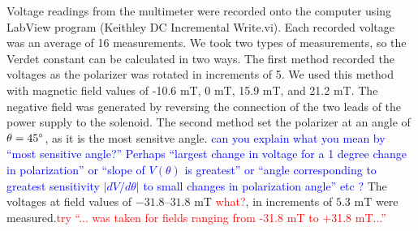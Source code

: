 \documentclass[prb,preprint]{revtex4-1}
\begin{document}
{Voltage readings from the multimeter were recorded onto the computer using LabView program (Keithley DC Incremental Write.vi). Each recorded voltage was an average of 16 measurements. We took two types of measurements, so the Verdet constant can be calculated in two ways.  The first method recorded the voltages as the polarizer was rotated in increments of 5\degree. We used this method with magnetic field values of -10.6 mT, 0 mT, 15.9 mT, and 21.2 mT. The negative field was generated by reversing the connection of the two leads of the power supply to the solenoid. The second method set the polarizer at an angle of $\theta = 45\degree$, as it is the most sensitve angle. \textcolor{blue}{can you explain what you mean by ``most sensitive angle?''  Perhaps ``largest change in voltage for a 1 degree change in polarization'' or ``slope of $V(\theta)$ is greatest'' or ``angle corresponding to greatest sensitivity $|dV/d\theta|$ to small changes in polarization angle'' etc ?} The voltages at field values of $-31.8$--$31.8$ mT \textcolor{red}{what?}, in increments of $5.3$ mT were measured.\textcolor{red}{try ``... was taken for fields ranging from -31.8 mT to +31.8 mT...''}
}
\end{document}

